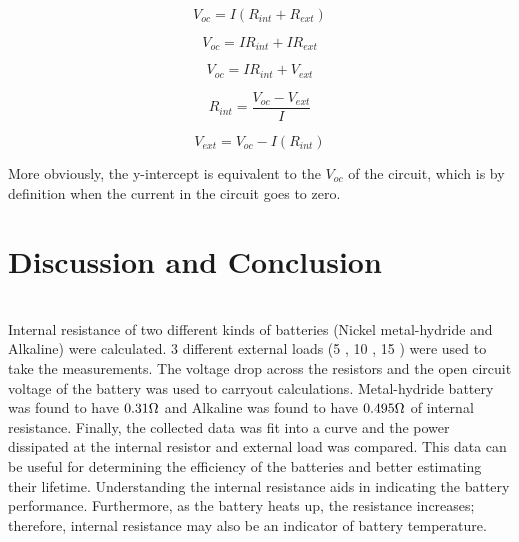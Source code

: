 \documentclass[journal]{IEEEtran}
\begin{document}
\begin{equation}
V_{oc} = I (R_{int} + R_{ext}) 
\label{eq:currentcalc}
\end{equation}

\begin{equation}
V_{oc} = I R_{int} + I  R_{ext}
\label{eq:currentcalc}
\end{equation}

\begin{equation}
V_{oc} = I R_{int} + V_{ext}
\label{eq:currentcalc}
\end{equation}

\begin{equation}
R_{int} = \frac{V_{oc} - V_{ext}}{I}
\label{eq:currentcalc}
\end{equation}

\begin{equation}
V_{ext} = V_{oc} - I(R_{int})
\label{eq:currentcalc}
\end{equation}


\noindent More obviously, the y-intercept is equivalent to the $V_{oc}$ of the circuit, which is by definition when the current in the circuit goes to zero. 

\section{Discussion and Conclusion}\\

\noindent Internal resistance of two different kinds of batteries (Nickel metal-hydride and Alkaline) were calculated. 3 different external loads (5 \ohm, 10 \ohm, 15 \ohm) were used to take the measurements. The voltage drop across the resistors and the open circuit voltage of the battery was used to carryout calculations. Metal-hydride battery was found to have $0.31 \ohm$ and Alkaline was found to have $0.495 \ohm$ of internal resistance. Finally, the collected data was fit into a curve and the power dissipated at the internal resistor and external load was compared. This data can be useful for determining the efficiency of the batteries and better estimating their lifetime. Understanding the internal resistance aids in indicating the battery performance. Furthermore, as the battery heats up, the resistance increases; therefore, internal resistance may also be an indicator of battery temperature.



\printbibliography
\end{document}
